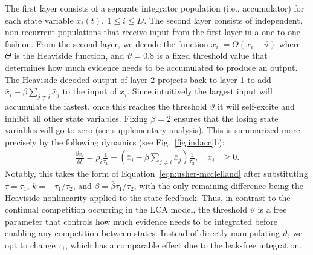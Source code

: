 \documentclass[10pt,letterpaper]{article}
\begin{document}
The first layer consists of a separate integrator population (i.e., accumulator) for each state variable $x_i(t), \ 1 \leq i \leq D$.
The second layer consists of independent, non-recurrent populations that receive input from the first layer in a one-to-one fashion.
From the second layer, we decode the function $\bar{x}_i := \Theta(x_i - \vartheta)$ where $\Theta$ is the Heaviside function, and $\vartheta = 0.8$ is a fixed threshold value that determines how much evidence needs to be accumulated to produce an output.
The Heaviside decoded output of layer 2 projects back to layer 1 to add $\bar{x}_i - \bar{\beta} \sum_{j \neq i} \bar{x}_j$ to the input of $x_i$.
Since intuitively the largest input will accumulate the fastest, once this reaches the threshold $\vartheta$ it will self-excite and inhibit all other state variables.
Fixing $\bar{\beta} = 2$ ensures that the losing state variables will go to zero (see supplementary analysis).
This is summarized more precisely by the following dynamics (see Fig.~\ref{fig:indacc}b):
\begin{equation}
    \begin{split}
        \frac{{\partial x}_i}{\partial t} = \rho_i \frac{1}{\tau_1} + \left( 
            \bar{x}_i - \bar{\beta} \sum_{j \neq i} \bar{x}_j \right) \frac{1}{\tau_2} , \quad x_i &\ge 0 .
    \end{split}
\end{equation}
Notably, this takes the form of Equation~\ref{eqn:usher-mcclelland} after substituting $\tau = \tau_1$, $k = -\tau_1/\tau_2$, and $\beta = \bar{\beta}\tau_1/\tau_2$, with the only remaining difference being the Heaviside nonlinearity applied to the state feedback.
Thus, in contrast to the continual competition occurring in the LCA model, the threshold $\vartheta$ is a free parameter that controls how much evidence needs to be integrated before enabling any competition between states.
Instead of directly manipulating $\vartheta$, we opt to change $\tau_1$, which has a comparable effect due to the leak-free integration.
\end{document}
